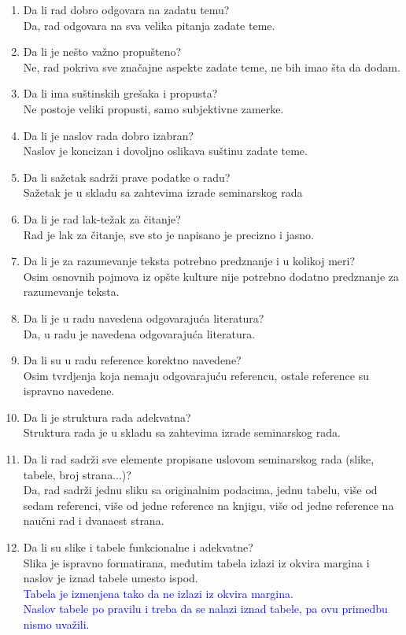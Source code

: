 \documentclass[a4paper]{report}
\newcommand{\odgovor}[1]{\textcolor{blue}{#1}}
\begin{document}
\begin{enumerate}
\item Da li rad dobro odgovara na zadatu temu?\\
Da, rad odgovara na sva velika pitanja zadate teme.
\item Da li je nešto važno propušteno?\\
Ne, rad pokriva sve značajne aspekte zadate teme, ne bih imao šta da dodam. 
\item Da li ima suštinskih grešaka i propusta?\\
Ne postoje veliki propusti, samo subjektivne zamerke.
\item Da li je naslov rada dobro izabran?\\
Naslov je koncizan i dovoljno oslikava suštinu zadate teme.
\item Da li sažetak sadrži prave podatke o radu?\\
Sažetak je u skladu sa zahtevima izrade seminarskog rada
\item Da li je rad lak-težak za čitanje?\\
Rad je lak za čitanje, sve sto je napisano je precizno i jasno.
\item Da li je za razumevanje teksta potrebno predznanje i u kolikoj meri?\\
Osim osnovnih pojmova iz opšte kulture nije potrebno dodatno predznanje za razumevanje teksta.
\item Da li je u radu navedena odgovarajuća literatura?\\
Da, u radu je navedena odgovarajuća literatura.
\item Da li su u radu reference korektno navedene?\\
Osim tvrdjenja koja nemaju odgovarajuću referencu, ostale reference su ispravno navedene. 
\item Da li je struktura rada adekvatna?\\
Struktura rada je u skladu sa zahtevima izrade seminarskog rada.
\item Da li rad sadrži sve elemente propisane uslovom seminarskog rada (slike, tabele, broj strana...)?\\
Da, rad sadrži jednu sliku sa originalnim podacima, jednu tabelu, više od sedam referenci, više od jedne reference na knjigu, više od jedne reference na naučni rad i dvanaest strana.
\item Da li su slike i tabele funkcionalne i adekvatne?\\
Slika je ispravno formatirana, međutim tabela izlazi iz okvira margina i naslov je iznad tabele umesto ispod.\\
\odgovor{Tabela je izmenjena tako da ne izlazi iz okvira margina.\\ Naslov tabele po pravilu i treba da se nalazi iznad tabele, pa ovu primedbu nismo uvažili.}
\end{enumerate}
\end{document}
